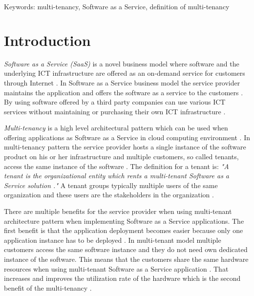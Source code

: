 \documentclass[conference]{sasmoota2017}
\begin{document}

Keywords: multi-tenancy, Software as a Service, definition of multi-tenancy



\IEEEpeerreviewmaketitle



\section{Introduction}

\textit{Software as a Service (SaaS)} is a novel business model where software and the underlying ICT infrastructure are offered as an on-demand service for customers through Internet \cite{Bezemer:2010:MaintenanceDream}. In Software as a Service business model the service provider maintains the application and offers the software as a service to the customers \cite{Bezemer:2010:MaintenanceDream}. By using software offered by a third party companies can use various ICT services without maintaining or purchasing their own ICT infrastructure \cite{Bezemer:2010:MaintenanceDream}. 

\textit{Multi-tenancy} is a high level architectural pattern which can be used when offering applications as Software as a Service in cloud computing environment \cite{Kabbedijk2015:Defining}. In multi-tenancy pattern the service provider hosts a single instance of the software product on his or her infrastructure and multiple customers, so called tenants, access the same instance of the software \cite{Bezemer:2010:MaintenanceDream}. The definition for a tenant is: \textit{"A tenant is the organizational entity which rents a multi-tenant Software as a Service solution \cite{Bezemer:2010:MaintenanceDream}."} A tenant groups typically multiple users of the same organization and these users are the stakeholders in the organization \cite{Bezemer:2010:MaintenanceDream}. 

There are multiple benefits for the service provider when using multi-tenant architecture pattern when implementing Software as a Service applications. The first benefit is that the application deployment becomes easier because only one application instance has to be deployed \cite{Bezemer:2010:MaintenanceDream}. In multi-tenant model multiple customers access the same software instance and they do not need own dedicated instance of the software. This means that the customers share the same hardware resources when using multi-tenant Software as a Service application \cite{Guo:2007:FrameworkForNative}. That increases and improves the utilization rate of the hardware which is the second benefit of the multi-tenancy \cite{Bezemer:2010:MaintenanceDream}. 
\end{document}
